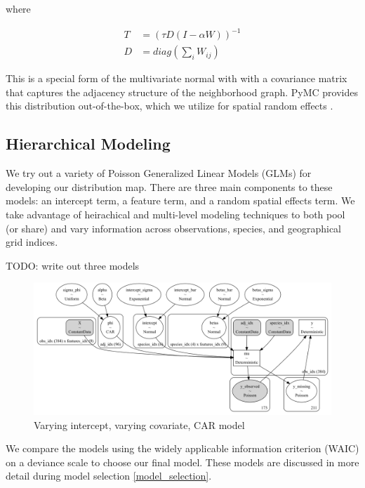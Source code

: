 \documentclass[notitlepage]{article}
\begin{document}
where

\begin{equation}
\begin{aligned}
    T &= (\tau D (I-\alpha W))^{-1} \\
    D &= diag(\sum_{i} W_{ij})
\end{aligned}
\end{equation}


This is a special form of the multivariate normal with with a covariance matrix that captures the adjacency structure of the neighborhood graph. 
PyMC provides this distribution out-of-the-box, which we utilize for spatial random effects \cite{salvatier_probabilistic_2016}.


\subsection{Hierarchical Modeling}

We try out a variety of Poisson Generalized Linear Models (GLMs) for developing our distribution map.
There are three main components to these models: an intercept term, a feature term, and a random spatial effects term.
We take advantage of heirachical and multi-level modeling techniques to both pool (or share) and vary information across observations, species, and geographical grid indices.

TODO: write out three models

\begin{figure}[hbt!]
\centering
\includegraphics[width=\textwidth]{report/figures/full_model.png}
\caption{Varying intercept, varying covariate, CAR model}
\end{figure}

We compare the models using the widely applicable information criterion (WAIC) on a deviance scale to choose our final model.
These models are discussed in more detail during model selection \ref{model_selection}.
\end{document}
